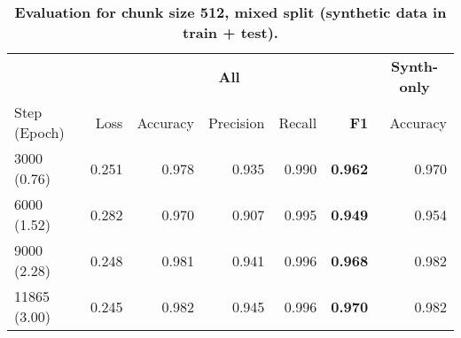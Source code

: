 \begin{table}[H]
\centering
\small
\caption[Evaluation for Chunk Size 512, Mixed Split]{\textbf{Evaluation for chunk size 512, mixed split (synthetic data in train + test).}}
\label{tab:512_mixed}
\begin{tabular}{@{}lrrrr rr@{}}
\toprule
  & \multicolumn{5}{c}{\textbf{All}} 
  & \multicolumn{1}{c}{\textbf{Synth-only}} \\
\cmidrule(lr){2-6} \cmidrule(lr){7-7}
Step (Epoch) & Loss & Accuracy & Precision & Recall & \textbf{F1} & Accuracy\\
\midrule
3000 (0.76) & 0.251 & 0.978 & 0.935 & 0.990 & \textbf{0.962} & 0.970 \\
6000 (1.52) & 0.282 & 0.970 & 0.907 & 0.995 & \textbf{0.949} & 0.954 \\
9000 (2.28) & 0.248 & 0.981 & 0.941 & 0.996 & \textbf{0.968} & 0.982 \\
11865 (3.00) & 0.245 & 0.982 & 0.945 & 0.996 & \textbf{0.970} & 0.982 \\
\bottomrule
\end{tabular}
\end{table}
